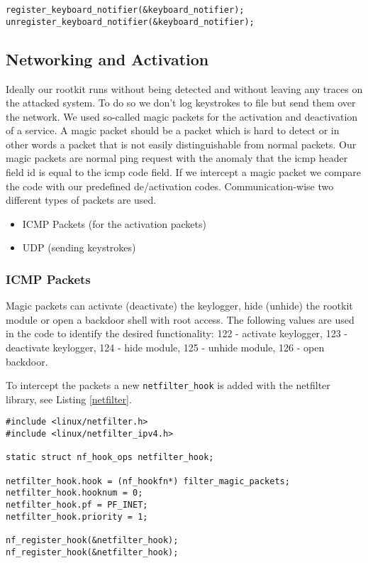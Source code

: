 \documentclass[12pt]{article}
\begin{document}
\begin{lstlisting}[caption=Register Keyboard, label=registerKeyboard]
register_keyboard_notifier(&keyboard_notifier);
unregister_keyboard_notifier(&keyboard_notifier);
\end{lstlisting}



\subsection{Networking and Activation}
Ideally our rootkit runs without being detected and without leaving any traces on the attacked system. To do so we don't log keystrokes to file but send them over the network. We used so-called magic packets for the activation and deactivation of a service. A magic packet should be a packet which is hard to detect or in other words a packet that is not easily distinguishable from normal packets. Our magic packets are normal ping request with the anomaly that the icmp header field id is equal to the icmp code field. If we intercept a magic packet we compare the code with our predefined de/activation codes.
\label{sec:magicpackage}
\newline Communication-wise two different types of packets are used.
\begin{itemize}
	\item ICMP Packets (for the activation packets)
	\item UDP (sending keystrokes)
\end{itemize}
\subsubsection{ICMP Packets}
Magic packets can activate (deactivate) the keylogger, hide (unhide) the rootkit module or open a backdoor shell with root access. The following values are used in the code to identify the desired functionality: 122 - activate keylogger, 123 - deactivate keylogger, 124 - hide module, 125 - unhide module, 126 - open backdoor.

To intercept the packets a new \lstinline{netfilter_hook} is added with the netfilter library, see Listing \ref{netfilter}. 
\begin{lstlisting}[caption=Netfilter Hook, label=netfilter]
#include <linux/netfilter.h>
#include <linux/netfilter_ipv4.h>

static struct nf_hook_ops netfilter_hook;

netfilter_hook.hook = (nf_hookfn*) filter_magic_packets;
netfilter_hook.hooknum = 0;
netfilter_hook.pf = PF_INET;
netfilter_hook.priority = 1;

nf_register_hook(&netfilter_hook);
nf_register_hook(&netfilter_hook);
\end{lstlisting}
\end{document}
